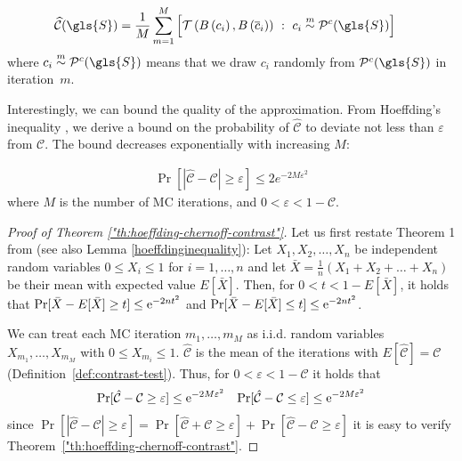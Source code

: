 \begin{definition}
	\label{def:contrast-approx}
	\begin{align} 
	\mathcal{\widehat{C}}(\gls{S}) &= 
	\frac{1}{M} \sum_{m=1}^{M} \left [ \mathcal{T} \left(B\left(c_{i}  \right), B\left(\overline{c}_i\right)\right)~:~c_{i}  \overset{m}{\sim} \mathcal{P}^c(\gls{S}) \right ]
	\end{align} 
	where $c_{i} \overset{m}{\sim} \mathcal{P}^c(\gls{S})$ means that we draw $c_i$ randomly from $\mathcal{P}^c(\gls{S})$ in iteration~$m$.
\end{definition}

\label{bound} Interestingly, we can bound the quality of the approximation. From Hoeffding's inequality \cite{doi:10.1080/01621459.1963.10500830},
we derive a bound on the probability of $\mathcal{\widehat{C}}$ to deviate not less than $\varepsilon$ from $\mathcal{C}$. The bound decreases exponentially with increasing $M$:

\begin{theorem}
	\label{"th:hoeffding-chernoff-contrast"}
	\begin{align}
	\Pr\left[| \mathcal{\widehat{C}} - \mathcal{C} | \geq \varepsilon \right] \leq 2e^{-2M \varepsilon^2}
	\end{align}
	where $M$ is the number of MC iterations, and $0 < \varepsilon < 1 - \mathcal{C}$. 
\end{theorem} 

\begin{proof}[Proof of Theorem \ref{"th:hoeffding-chernoff-contrast"}]
	Let us first restate Theorem 1 from \cite{doi:10.1080/01621459.1963.10500830} (see also Lemma \ref{hoeffdinginequality}): 
	Let $X_1, X_2, \dots, X_n$ be independent random variables $0 \leq X_i \leq 1$ for $i=1,\dots,n$ and let $\bar{X} = \frac{1}{n}(X_1 + X_2 + \dots + X_n)$ be their mean with expected value $E[\bar{X}]$. Then, for $0<t<1-E[\bar{X}]$, it holds that $\Pr[\bar{X}-E[\bar{X}] \geq t] \leq \mathrm{e}^{-2nt^2}$ and $\Pr[\bar{X}-E[\bar{X}] \leq t] \leq \mathrm{e}^{-2nt^2}$.

	We can treat each MC iteration $m_1, \dots, m_M$ as i.i.d. random variables $X_{m_1}, \dots, X_{m_M}$ with $0 \leq X_{m_i} \leq 1$. $\mathcal{\hat{C}}$ is the mean of the iterations with $E[\mathcal{\hat{C}}] = \mathcal{C}$ (\mbox{Definition \ref{def:contrast-test}}). Thus, for $0 < \varepsilon < 1 - \mathcal{C}$ it holds that
	\begin{align}
	\Pr[\mathcal{\hat{C}}-\mathcal{C} \geq \varepsilon] \leq \mathrm{e}^{-2M\varepsilon^2} && \Pr[\mathcal{\hat{C}}-\mathcal{C} \leq \varepsilon] \leq \mathrm{e}^{-2M\varepsilon^2}
	\end{align}
	since $\Pr[|\mathcal{\hat{C}}-\mathcal{C}| \geq \varepsilon] = \Pr[\mathcal{\hat{C}}+\mathcal{C} \geq \varepsilon] + \Pr[\mathcal{\hat{C}}-\mathcal{C} \geq \varepsilon]$ it is easy to verify Theorem~\ref{"th:hoeffding-chernoff-contrast"}.
\end{proof}

